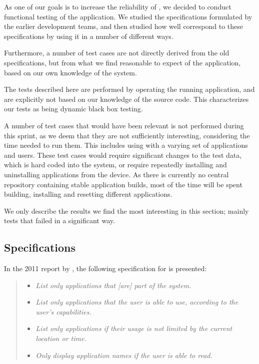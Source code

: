 As one of our goals is to increase the reliability of \launcher, we decided to conduct functional testing of the application.
We studied the specifications formulated by the earlier development teams\cite{launcher2011,launcher2012}, and then studied how well \launcher correspond to these specifications by using it in a number of different ways. 

Furthermore, a number of test cases are not directly derived from the old specifications, but from what we find reasonable to expect of the application, based on our own knowledge of the system.

The tests described here are performed by operating the running application, and are explicitly not based on our knowledge of the source code. 
This characterizes our tests as being dynamic black box testing\cite{blackboxTesting}.

A number of test cases that would have been relevant is not performed during this sprint, as we deem that they are not sufficiently interesting, considering the time needed to run them. 
This includes using \launcher with a varying set of applications and users.
These test cases would require significant changes to the test data, which is hard coded into the \giraf system, or require repeatedly installing and uninstalling applications from the device.
As there is currently no central repository containing stable application builds, most of the time will be spent building, installing and resetting different applications.

We only describe the results we find the most interesting in this section; mainly tests that failed in a significant way.

\subsection{Specifications}
In the 2011 report by \citet{launcher2011}, the following specification for \launcher is presented:

\begin{quote}
\begin{itemize}
	\item \textit{List only applications that [are] part of the \giraf system.}
	\item \textit{List only applications that the user is able to use, according to the user's capabilities.}
	\item \textit{List only applications if their usage is not limited by the current location or time.}
	\item \textit{Only display application names if the user is able to read.}
\end{itemize}
\end{quote}

